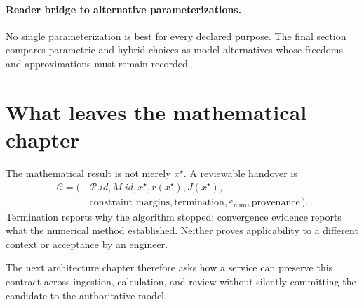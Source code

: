 \paragraph{Reader bridge to alternative parameterizations.}
No single parameterization is best for every declared purpose. The final
section compares parametric and hybrid choices as model alternatives whose
freedoms and approximations must remain recorded.


\section*{What leaves the mathematical chapter}

The mathematical result is not merely \(x^\star\). A reviewable handover is
\[
\begin{aligned}
\mathcal C=(\,&\mathcal P.id,M.id,x^\star,r(x^\star),J(x^\star),\\
             &\text{constraint margins},\text{termination},
             \varepsilon_{\mathrm{num}},\text{provenance}\,).
\end{aligned}
\]
Termination reports why the algorithm stopped; convergence evidence reports
what the numerical method established. Neither proves applicability to a
different context or acceptance by an engineer.

The next architecture chapter therefore asks how a service can preserve this
contract across ingestion, calculation, and review without silently committing
the candidate to the authoritative model.
